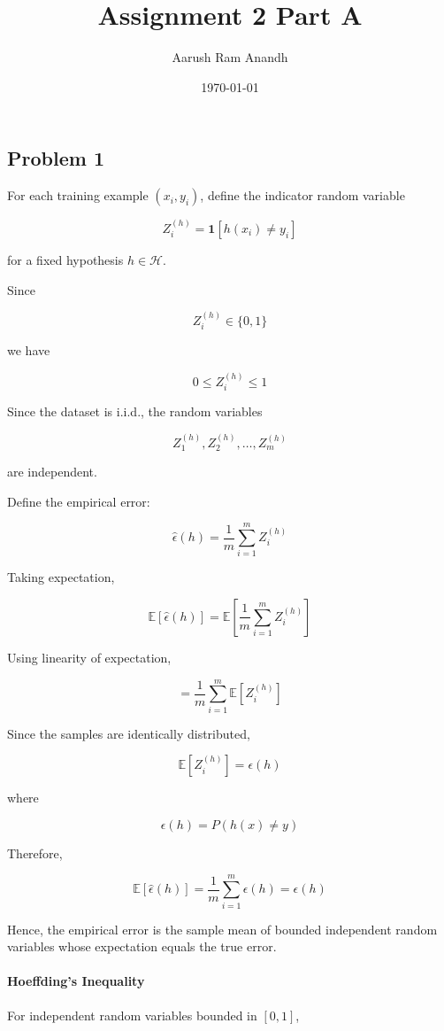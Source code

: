 \documentclass[12pt]{article}
\title{Assignment 2 Part A}
\author{Aarush Ram Anandh}
\date{\today}
\begin{document}
\maketitle
\subsection*{Problem 1}

For each training example \((x_i,y_i)\), define the indicator random variable

\[
Z_i^{(h)}
=
\mathbf{1}[h(x_i)\neq y_i]
\]

for a fixed hypothesis \(h \in \mathcal H\).

Since

\[
Z_i^{(h)} \in \{0,1\}
\]

we have

\[
0 \leq Z_i^{(h)} \leq 1
\]

Since the dataset is i.i.d., the random variables

\[
Z_1^{(h)}, Z_2^{(h)}, \dots, Z_m^{(h)}
\]

are independent.

Define the empirical error:

\[
\hat{\epsilon}(h)
=
\frac{1}{m}\sum_{i=1}^{m} Z_i^{(h)}
\]

Taking expectation,

\[
\mathbb E[\hat{\epsilon}(h)]
=
\mathbb E\left[
\frac{1}{m}\sum_{i=1}^{m} Z_i^{(h)}
\right]
\]

Using linearity of expectation,

\[
=
\frac{1}{m}\sum_{i=1}^{m}\mathbb E[Z_i^{(h)}]
\]

Since the samples are identically distributed,

\[
\mathbb E[Z_i^{(h)}]
=
\epsilon(h)
\]

where

\[
\epsilon(h)
=
P(h(x)\neq y)
\]

Therefore,

\[
\mathbb E[\hat{\epsilon}(h)]
=
\frac{1}{m}\sum_{i=1}^{m}\epsilon(h)
=
\epsilon(h)
\]

Hence, the empirical error is the sample mean of bounded independent random variables whose expectation equals the true error.

\paragraph{Hoeffding's Inequality}

For independent random variables bounded in \([0,1]\),
\end{document}
